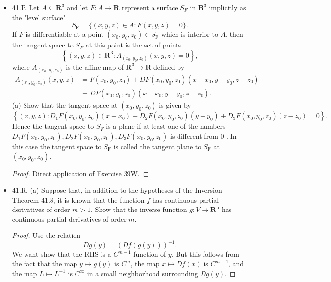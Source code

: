 \begin{itemize}
\item 
41.P. Let $A \subseteq \boldsymbol{R}^3$ and let $F: A \rightarrow \boldsymbol{R}$ represent a surface $S_F$ in $\boldsymbol{R}^3$ implicitly as the "level surface"
\[
S_{\mathrm{F}}=\{(x, y, z) \in A: F(x, y, z)=0\} .
\]
If $F$ is differentiable at a point $\left(x_0, y_0, z_0\right) \in S_{\mathrm{F}}$ which is interior to $A$, then the tangent space to $S_F$ at this point is the set of points
\[
\left\{(x, y, z) \in \boldsymbol{R}^3: A_{\left(x_0, y_0, z_0\right)}(x, y, z)=0\right\},
\]
where $A_{\left(x_0, y_0, z_0\right)}$ is the affine map of $\boldsymbol{R}^3 \rightarrow \boldsymbol{R}$ defined by
\[
\begin{aligned}
A_{\left(x_0, y_0, z_0\right)}(x, y, z) & =F\left(x_0, y_0, z_0\right)+D F\left(x_0, y_0, z_0\right)\left(x-x_0, y-y_0, z-z_0\right) \\
& =D F\left(x_0, y_0, z_0\right)\left(x-x_0, y-y_0, z-z_0\right) .
\end{aligned}
\]
(a) Show that the tangent space at $\left(x_0, y_0, z_0\right)$ is given by
\[
\left\{(x, y, z): D_1 F\left(x_0, y_0, z_0\right)\left(x-x_0\right)+D_2 F\left(x_0, y_0, z_0\right)\left(y-y_0\right)+D_3 F\left(x_0, y_0, z_0\right)\left(z-z_0\right)=0\right\} .
\]
Hence the tangent space to $S_F$ is a plane if at least one of the numbers $D_1 F\left(x_0, y_0, z_0\right), D_2 F\left(x_0, y_0, z_0\right), D_3 F\left(x_0, y_0, z_0\right)$ is different from 0 . In this case the tangent space to $S_{\mathrm{F}}$ is called the tangent plane to $S_{\mathrm{F}}$ at $\left(x_0, y_0, z_0\right)$.
\begin{proof}
	Direct application of Exercise 39W.
\end{proof}

\item 41.R. (a) Suppose that, in addition to the hypotheses of the Inversion Theorem 41.8, it is known that the function $f$ has continuous partial derivatives of order $m>1$. Show that the inverse function $g: V \rightarrow \boldsymbol{R}^{\mathrm{p}}$ has continuous partial derivatives of order $m$.
\begin{proof}
	Use the relation
	\[
		Dg(y) = \left( Df(g(y)) \right) ^{-1}
	.\] 
	We want show that the RHS is a $C^{m-1}$ function of $y$. But this follows from the fact that the map $y \mapsto g(y)$ is $C^{m}$, the map $x \mapsto Df(x)$ is $C^{m-1}$, and the map $L \mapsto L^{-1}$ is $C^{\infty }$ in a small neighborhood surrounding $Dg(y)$.
\end{proof}


\end{itemize}
